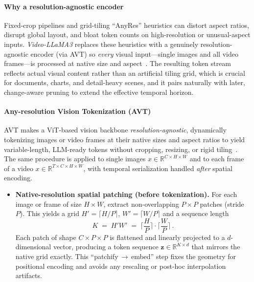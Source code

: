 \begin{enrichment}
\begin{enrichment}
        \paragraph{Why a resolution\mbox{-}agnostic encoder}
        Fixed\mbox{-}crop pipelines and grid\mbox{-}tiling “AnyRes” heuristics can distort aspect ratios, disrupt global layout, and bloat token counts on high\mbox{-}resolution or unusual\mbox{-}aspect inputs. \emph{Video\mbox{-}LLaMA3} replaces these heuristics with a genuinely resolution\mbox{-}agnostic encoder (via AVT) so \emph{every} visual input—single images and all video frames—is processed at native size and aspect~\cite[Sec.~3.1]{zhang2025_videollama3}. The resulting token stream reflects actual visual content rather than an artificial tiling grid, which is crucial for documents, charts, and detail\mbox{-}heavy scenes, and it pairs naturally with later, change\mbox{-}aware pruning to extend the effective temporal horizon.
        
        \paragraph{Any\mbox{-}resolution Vision Tokenization (AVT)}
        AVT makes a ViT\mbox{-}based vision backbone \emph{resolution\mbox{-}agnostic}, dynamically tokenizing images or video frames at their native sizes and aspect ratios to yield variable\mbox{-}length, LLM\mbox{-}ready tokens without cropping, resizing, or rigid tiling~\cite[Sec.~3.1]{zhang2025_videollama3}. The same procedure is applied to single images $x\!\in\!\mathbb{R}^{C\times H\times W}$ and to each frame of a video $x\!\in\!\mathbb{R}^{T\times C\times H\times W}$, with temporal serialization handled \emph{after} spatial encoding.
        
        \begin{itemize}
            \item \textbf{Native\mbox{-}resolution spatial patching (before tokenization).} For each image or frame of size $H{\times}W$, extract non\mbox{-}overlapping $P{\times}P$ patches (stride $P$). This yields a grid $H'=\lceil H/P\rceil$, $W'=\lceil W/P\rceil$ and a sequence length
            \[
            K \;=\; H' W' \;=\; \Big\lceil\frac{H}{P}\Big\rceil \!\cdot\! \Big\lceil\frac{W}{P}\Big\rceil\,.
            \]
            Each patch of shape $C\!\times\!P\!\times\!P$ is flattened and linearly projected to a $d$-dimensional vector, producing a token sequence $\mathbf{z}\in\mathbb{R}^{K\times d}$ that mirrors the native grid exactly. This “patchify\,$\rightarrow$\,embed” step fixes the geometry for positional encoding and avoids any rescaling or post\mbox{-}hoc interpolation artifacts.
            

\end{itemize}
\end{enrichment}
\end{enrichment}
